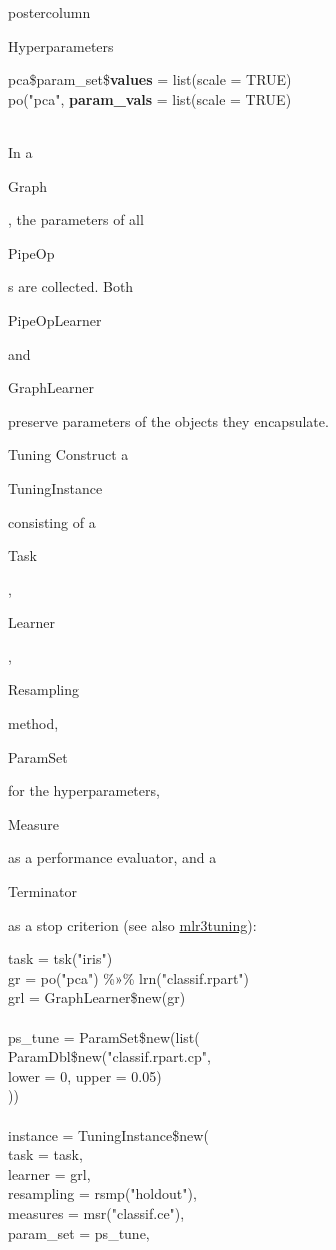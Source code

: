 \documentclass{beamer}
\newcommand{\codeinline}[1]{\begin{codeboxinline}#1\end{codeboxinline}}
\begin{document}
\begin{frame}[fragile]{}
\begin{columns}
\begin{column}{.245\textwidth}
\begin{beamercolorbox}[center]{postercolumn}
\begin{minipage}{.98\textwidth}
{\begin{myblock}{Hyperparameters}
\begin{codeboxmultiline}[width=25cm]
                pca\$param\_set\$\textbf{values} = list(scale = TRUE) \\
                po("pca", \textbf{param\_vals} = list(scale = TRUE)
              \end{codeboxmultiline}
              \ \\
              In a \codeinline{Graph}, the parameters of all \codeinline{PipeOp}s are collected. Both \codeinline{PipeOpLearner} and \codeinline{GraphLearner} preserve parameters of the objects they encapsulate.
            \end{myblock}
            \begin{myblock}{Tuning}
              Construct a \codeinline{TuningInstance} consisting of a \codeinline{Task}, \codeinline{Learner}, \codeinline{Resampling} method, \codeinline{ParamSet} for the hyperparameters, \codeinline{Measure} as a performance evaluator, and a \codeinline{Terminator} as a stop criterion (see also \href{FIXME:CheatsheetLink}{mlr3tuning}):
              \begin{codeboxexample}
						  {\footnotesize
                task = tsk("iris")\\
                gr = po("pca") \%»\% lrn("classif.rpart")\\
                grl = GraphLearner\$new(gr)\\
                \ \\
                ps\_tune = ParamSet\$new(list(\\
                \hspace*{1ex} ParamDbl\$new("classif.rpart.cp",\\
                \hspace*{2ex} lower = 0, upper = 0.05)\\
                ))\\
                \ \\
                instance = TuningInstance\$new(\\
                \hspace*{1ex} task = task,\\
                \hspace*{1ex} learner = grl,\\
                \hspace*{1ex} resampling = rsmp("holdout"),\\
                \hspace*{1ex} measures = msr("classif.ce"),\\
                \hspace*{1ex} param\_set = ps\_tune,\\
}
\end{codeboxexample}
\end{myblock}}
\end{minipage}
\end{beamercolorbox}
\end{column}
\end{columns}
\end{frame}
\end{document}
